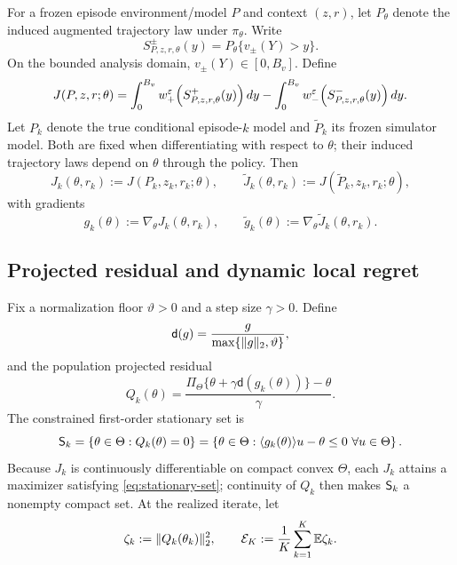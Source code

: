 For a frozen episode environment/model $P$ and context $(z,r)$, let $P_\theta$ denote the induced augmented trajectory law under $\pi_\theta$.  Write
\[
 S_{P,z,r,\theta}^{\pm}(y)
 =P_\theta\{v_\pm(Y)>y\}.
\]
On the bounded analysis domain, $v_\pm(Y)\in[0,B_v]$.  Define
\begin{equation}\label{eq:generic-cpt-objective}
 J(P,z,r;\theta)
 =\int_0^{B_v}w_+^\varepsilon\!\left(S_{P,z,r,\theta}^{+}(y)\right)dy
 -\int_0^{B_v}w_-^\varepsilon\!\left(S_{P,z,r,\theta}^{-}(y)\right)dy.
\end{equation}
Let $P_k$ denote the true conditional episode-$k$ model and $\widetilde P_k$ its frozen simulator model.  Both are fixed when differentiating with respect to $\theta$; their induced trajectory laws depend on $\theta$ through the policy.  Then
\begin{equation}\label{eq:true-sim-objectives}
 J_k(\theta,r_k):=J(P_k,z_k,r_k;\theta),
 \qquad
 \widetilde J_k(\theta,r_k):=J(\widetilde P_k,z_k,r_k;\theta),
\end{equation}
with gradients
\begin{equation}\label{eq:true-sim-gradients}
 g_k(\theta):=\nabla_\theta J_k(\theta,r_k),
 \qquad
 \widetilde g_k(\theta):=\nabla_\theta\widetilde J_k(\theta,r_k).
\end{equation}

\subsection{Projected residual and dynamic local regret}

Fix a normalization floor $\vartheta>0$ and a step size $\gamma>0$.  Define
\begin{equation}\label{eq:normalized-direction}
 \mathsf d(g)=\frac{g}{\max\{\lVert g\rVert_2,\vartheta\}},
\end{equation}
and the population projected residual
\begin{equation}\label{eq:projected-residual}
 Q_k(\theta)
 =\frac{\Pi_\Theta\{\theta+\gamma\mathsf d(g_k(\theta))\}-\theta}{\gamma}.
\end{equation}
The constrained first-order stationary set is
\begin{equation}\label{eq:stationary-set}
 \mathsf S_k
 =\{\theta\in\Theta:Q_k(\theta)=0\}
 =\left\{\theta\in\Theta:
 \langle g_k(\theta)\rangle{u-\theta}\le0\ \forall u\in\Theta\right\}.
\end{equation}
Because $J_k$ is continuously differentiable on compact convex $\Theta$, each $J_k$ attains a maximizer satisfying \eqref{eq:stationary-set}; continuity of $Q_k$ then makes $\mathsf S_k$ a nonempty compact set.  At the realized iterate, let
\begin{equation}\label{eq:periodwise-residual}
 \zeta_k:=\lVert Q_k(\theta_k)\rVert_2^2,
 \qquad
 \mathcal E_K:=\frac1K\sum_{k=1}^{K}\mathbb E\zeta_k.
\end{equation}

